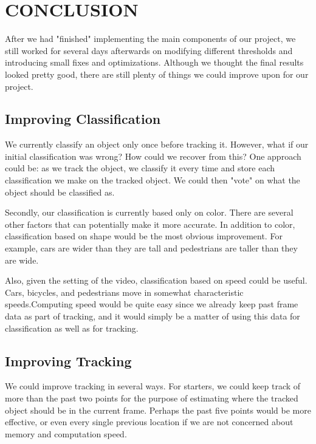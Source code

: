 \documentclass[a4paper, 10pt, conference]{ieeeconf}      %
\begin{document}
\section{CONCLUSION}

After we had "finished" implementing the main components of our project, we still worked for several days afterwards on modifying different thresholds and introducing small fixes and optimizations. Although we thought the final results looked pretty good, there are still plenty of things we could improve upon for our project. \newline


\subsection{Improving Classification}
We currently classify an object only once before tracking it. However, what if our initial classification was wrong? How could we recover from this? One approach could be: as we track the object, we classify it every time and store each classification we make on the tracked object. We could then "vote" on what the object should be classified as. \newline

Secondly, our classification is currently based only on color. There are several other factors that can potentially make it more accurate. In addition to color, classification based on shape would be the most obvious improvement. For example, cars are wider than they are tall and pedestrians are taller than they are wide. \newline

Also, given the setting of the video, classification based on speed could be useful. Cars, bicycles, and pedestrians move in somewhat characteristic speeds.Computing speed would be quite easy since we already keep past frame data as part of tracking, and it would simply be a matter of using this data for classification as well as for tracking. \newline


\subsection{Improving Tracking}
We could improve tracking in several ways. For starters, we could keep track of more than the past two points for the purpose of estimating where the tracked object should be in the current frame. Perhaps the past five points would be more effective, or even every single previous location if we are not concerned about memory and computation speed. \newline
\end{document}
